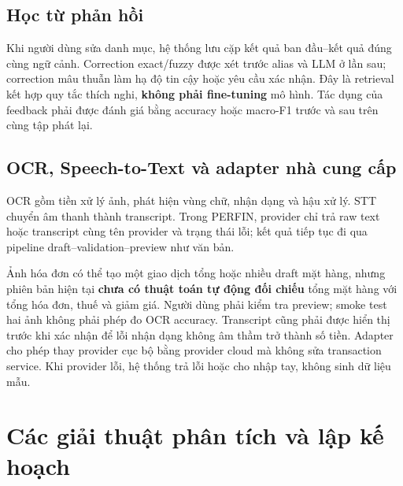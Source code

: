 \subsection{Học từ phản hồi}

Khi người dùng sửa danh mục, hệ thống lưu cặp kết quả ban đầu--kết quả
đúng cùng ngữ cảnh. Correction exact/fuzzy được xét trước alias và LLM ở
lần sau; correction mâu thuẫn làm hạ độ tin cậy hoặc yêu cầu xác nhận.
Đây là retrieval kết hợp quy tắc thích nghi, \textbf{không phải
fine-tuning} mô hình. Tác dụng của feedback phải được đánh giá bằng
accuracy hoặc macro-F1 trước và sau trên cùng tập phát lại.

\subsection{OCR, Speech-to-Text và adapter nhà cung cấp}

OCR gồm tiền xử lý ảnh, phát hiện vùng chữ, nhận dạng và hậu xử lý. STT
chuyển âm thanh thành transcript. Trong PERFIN, provider chỉ trả raw
text hoặc transcript cùng tên provider và trạng thái lỗi; kết quả tiếp
tục đi qua pipeline draft--validation--preview như văn bản.

Ảnh hóa đơn có thể tạo một giao dịch tổng hoặc nhiều draft mặt hàng,
nhưng phiên bản hiện tại \textbf{chưa có thuật toán tự động đối chiếu}
tổng mặt hàng với tổng hóa đơn, thuế và giảm giá. Người dùng phải kiểm
tra preview; smoke test hai ảnh không phải phép đo OCR accuracy.
Transcript cũng phải được hiển thị trước khi xác nhận để lỗi nhận dạng
không âm thầm trở thành số tiền. Adapter cho phép thay provider cục bộ
bằng provider cloud mà không sửa transaction service. Khi provider lỗi,
hệ thống trả lỗi hoặc cho nhập tay, không sinh dữ liệu mẫu.

\section{Các giải thuật phân tích và lập kế hoạch}

